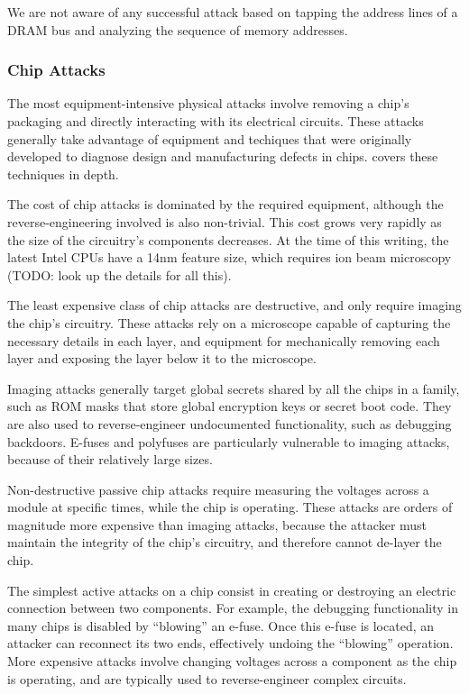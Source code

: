 We are not aware of any successful attack based on tapping the address lines of
a DRAM bus and analyzing the sequence of memory addresses.


\subsubsection{Chip Attacks}
\label{sec:physical_chip_attacks}

The most equipment-intensive physical attacks involve removing a chip's
packaging and directly interacting with its electrical circuits. These attacks
generally take advantage of equipment and techiques that were originally
developed to diagnose design and manufacturing defects in chips.
\cite{beck1998integrated} covers these techniques in depth.

The cost of chip attacks is dominated by the required equipment, although the
reverse-engineering involved is also non-trivial. This cost grows very rapidly
as the size of the circuitry's components decreases. At the time of this
writing, the latest Intel CPUs have a 14nm feature size, which requires ion
beam microscopy (TODO: look up the details for all this).

The least expensive class of chip attacks are destructive, and only require
imaging the chip's circuitry. These attacks rely on a microscope capable of
capturing the necessary details in each layer, and equipment for mechanically
removing each layer and exposing the layer below it to the microscope.

Imaging attacks generally target global secrets shared by all the chips in a
family, such as ROM masks that store global encryption keys or secret boot
code. They are also used to reverse-engineer undocumented functionality, such
as debugging backdoors. E-fuses and polyfuses are particularly vulnerable to
imaging attacks, because of their relatively large sizes.

Non-destructive passive chip attacks require measuring the voltages across a
module at specific times, while the chip is operating. These attacks are orders
of magnitude more expensive than imaging attacks, because the attacker must
maintain the integrity of the chip's circuitry, and therefore cannot de-layer
the chip.

The simplest active attacks on a chip consist in creating or destroying an
electric connection between two components. For example, the debugging
functionality in many chips is disabled by ``blowing'' an e-fuse. Once this
e-fuse is located, an attacker can reconnect its two ends, effectively undoing
the ``blowing'' operation. More expensive attacks involve changing voltages
across a component as the chip is operating, and are typically used to
reverse-engineer complex circuits.

